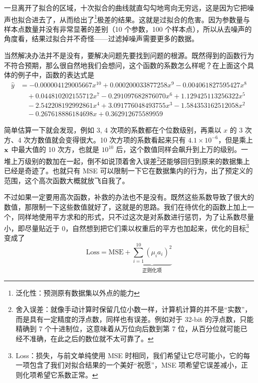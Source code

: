 一旦离开了拟合的区域，十次拟合的曲线就直勾勾地弯向无穷远，这是因为它把噪声也拟合进去了，从而给出了\footnote{泛化性：预测原有数据集以外点的能力}极差的结果。这就是过拟合的危害。因为参数量与样本点数量并没有非常显著的差别（10 个参数，100 个样本点），所以从去噪声的角度看，结果过拟合并不奇怪——过滤掉噪声需要更多的数据。

当然解决办法并不是没有，要解决问题先要找到问题的根源。既然得到的函数行为不符合预期，那么很自然地我们会想问，这个函数的系数怎么样呢？在上面这个具体的例子中，函数的表达式是
\[
    \begin{aligned}
        \hat y & = -0.000004129005667 x^{10} + 0.000200033877258 x^9 - 0.004061827595427 x^8   \\
               & \quad + 0.044810202155712 x^7 - 0.291097682876070 x^6 + 1.129425113256322 x^5 \\
               & \quad - 2.542208192992861 x^4 + 3.091776048493755 x^3 - 1.584353162512058 x^2 \\
               & \quad - 0.267618886184698 x + 0.362912675589959
    \end{aligned}
\]

简单估算一下就会发现，例如 3, 4 次项的系数都在个位数级别，再乘以 $x$ 的 3 次方、4 次方数值就会变得很大。10 次方项的系数看起来只有 $4.1\times 10^{-6}$，但是乘上 ${\mathbf{x}}$ 中最大值的 10 次方，也就是 $10^{10}$ 后，这个数值同样会飙升到上万的级别。一堆上万级别的数加在一起，倒不如说顶着舍入误差\footnote{舍入误差：就像手动计算时保留几位小数一样，计算机计算的并不是“实数”，而是具有一定精度的浮点数，同样也有误差。例如对于 32-bit 的浮点数，只能精确到 7 个十进制位，这意味着从万位向后数到第 7 位，从百分位就可能已经不准确，在此之后的数位就不太可靠了。}还能够回归到原来的数据集上已经是奇迹了。也就只有 MSE 可以限制一下它在数据集内的行为，出了预定义的范围，这个高次函数大概就放飞自我了。

不过如果一定要用高次函数，补救的办法也不是没有。既然这些系数导致了很大的数值，那限制一下这些数值就好了，这就是的思路。我们在待优化的函数上加上一个，同样地使用平方求和的形式，只不过这次是对系数进行惩罚，为了让系数尽量小，即尽量贴近于 $0$，自然想到把它们乘以权重后的平方也加起来，优化的目标\footnote{Loss：损失，与前文单纯使用 MSE 时相同，我们希望让它尽可能小，它的每一项包含了我们对拟合结果的一个美好“祝愿”，MSE 项希望它误差减小，正则化项希望它系数正常。}变成了
\[
    \text{Loss} = \text{MSE} + \underset{\text{正则化项}}{\underbrace{\sum_{i=1}^{10} (\mu_i a_i)^2}}
\]

